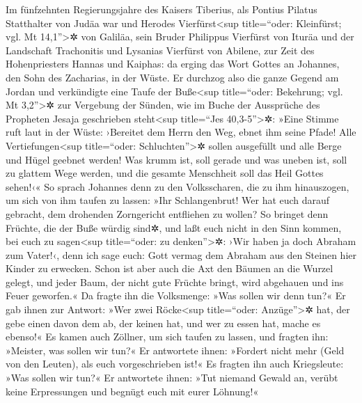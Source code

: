 Im fünfzehnten Regierungsjahre des Kaisers Tiberius, als
Pontius Pilatus Statthalter von Judäa war und Herodes
Vierfürst\textless sup title=``oder: Kleinfürst; vgl. Mt
14,1''\textgreater✲ von Galiläa, sein Bruder Philippus Vierfürst von
Ituräa und der Landschaft Trachonitis und Lysanias Vierfürst von
Abilene,  zur Zeit des Hohenpriesters Hannas und Kaiphas:
da erging das Wort Gottes an Johannes, den Sohn des Zacharias, in der
Wüste.  Er durchzog also die ganze Gegend am Jordan und
verkündigte eine Taufe der Buße\textless sup title=``oder: Bekehrung;
vgl. Mt 3,2''\textgreater✲ zur Vergebung der Sünden,  wie
im Buche der Aussprüche des Propheten Jesaja geschrieben
steht\textless sup title=``Jes 40,3-5''\textgreater✲: »Eine Stimme ruft
laut in der Wüste: ›Bereitet dem Herrn den Weg, ebnet ihm seine Pfade!
 Alle Vertiefungen\textless sup title=``oder:
Schluchten''\textgreater✲ sollen ausgefüllt und alle Berge und Hügel
geebnet werden! Was krumm ist, soll gerade und was uneben ist, soll zu
glattem Wege werden,  und die gesamte Menschheit soll das
Heil Gottes sehen!‹«  So sprach Johannes denn zu den
Volksscharen, die zu ihm hinauszogen, um sich von ihm taufen zu lassen:
»Ihr Schlangenbrut! Wer hat euch darauf gebracht, dem drohenden
Zorngericht entfliehen zu wollen?  So bringet denn
Früchte, die der Buße würdig sind✲, und laßt euch nicht in den Sinn
kommen, bei euch zu sagen\textless sup title=``oder: zu
denken''\textgreater✲: ›Wir haben ja doch Abraham zum Vater!‹, denn ich
sage euch: Gott vermag dem Abraham aus den Steinen hier Kinder zu
erwecken.  Schon ist aber auch die Axt den Bäumen an die
Wurzel gelegt, und jeder Baum, der nicht gute Früchte bringt, wird
abgehauen und ins Feuer geworfen.«  Da fragte ihn die
Volksmenge: »Was sollen wir denn tun?«  Er gab ihnen zur
Antwort: »Wer zwei Röcke\textless sup title=``oder:
Anzüge''\textgreater✲ hat, der gebe einen davon dem ab, der keinen hat,
und wer zu essen hat, mache es ebenso!«  Es kamen auch
Zöllner, um sich taufen zu lassen, und fragten ihn: »Meister, was sollen
wir tun?«  Er antwortete ihnen: »Fordert nicht mehr (Geld
von den Leuten), als euch vorgeschrieben ist!«  Es
fragten ihn auch Kriegsleute: »Was sollen wir tun?« Er antwortete ihnen:
»Tut niemand Gewald an, verübt keine Erpressungen und begnügt euch mit
eurer Löhnung!«

